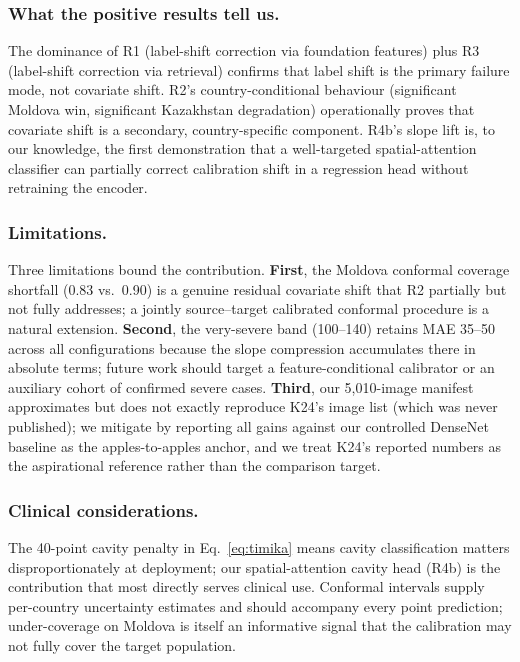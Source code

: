 \documentclass[runningheads]{llncs}
\begin{document}
\subsubsection{What the positive results tell us.}
The dominance of R1 (label-shift correction via foundation features) plus R3 (label-shift correction via retrieval) confirms that label shift is the primary failure mode, not covariate shift. R2's country-conditional behaviour (significant Moldova win, significant Kazakhstan degradation) operationally proves that covariate shift is a secondary, country-specific component. R4b's slope lift is, to our knowledge, the first demonstration that a well-targeted spatial-attention classifier can partially correct calibration shift in a regression head without retraining the encoder.

\subsubsection{Limitations.}
Three limitations bound the contribution. \textbf{First}, the Moldova conformal coverage shortfall (0.83 vs.\ 0.90) is a genuine residual covariate shift that R2 partially but not fully addresses; a jointly source--target calibrated conformal procedure is a natural extension. \textbf{Second}, the very-severe band (100--140) retains MAE 35--50 across all configurations because the slope compression accumulates there in absolute terms; future work should target a feature-conditional calibrator or an auxiliary cohort of confirmed severe cases. \textbf{Third}, our 5{,}010-image manifest approximates but does not exactly reproduce K24's image list (which was never published); we mitigate by reporting all gains against our controlled DenseNet baseline as the apples-to-apples anchor, and we treat K24's reported numbers as the aspirational reference rather than the comparison target.

\subsubsection{Clinical considerations.}
The 40-point cavity penalty in Eq.~\ref{eq:timika} means cavity classification matters disproportionately at deployment; our spatial-attention cavity head (R4b) is the contribution that most directly serves clinical use. Conformal intervals supply per-country uncertainty estimates and should accompany every point prediction; under-coverage on Moldova is itself an informative signal that the calibration may not fully cover the target population.
\end{document}
